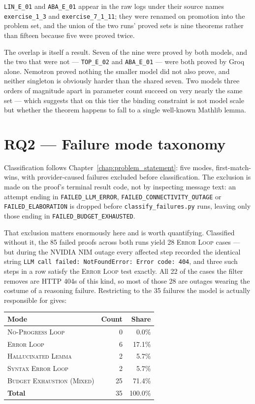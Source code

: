 \texttt{LIN\_E\_01} and \texttt{ABA\_E\_01} appear in the raw logs under their
source names \texttt{exercise\_1\_3} and \texttt{exercise\_7\_1\_11}; they were
renamed on promotion into the problem set, and the union of the two runs' proved
sets is nine theorems rather than fifteen because five were proved twice.

The overlap is itself a result.
Seven of the nine were proved by both models, and the two that were not ---
\texttt{TOP\_E\_02} and \texttt{ABA\_E\_01} --- were both proved by Groq alone.
Nemotron proved nothing the smaller model did not also prove, and neither
singleton is obviously harder than the shared seven.
Two models three orders of magnitude apart in parameter count succeed on very
nearly the same set --- which suggests that on this tier the binding constraint
is not model scale but whether the theorem happens to fall to a single
well-known Mathlib lemma.

\section{RQ2 --- Failure mode taxonomy}
\label{sec:results_rq2}

Classification follows Chapter~\ref{chap:problem_statement}: five modes,
first-match-wins, with provider-caused failures excluded before classification.
The exclusion is made on the proof's terminal result code, not by inspecting
message text: an attempt ending in \texttt{FAILED\_LLM\_ERROR},
\texttt{FAILED\_CONNECTIVITY\_OUTAGE} or \texttt{FAILED\_ELABORATION} is dropped
before \texttt{classify\_failures.py} runs, leaving only those ending in
\texttt{FAILED\_BUDGET\_EXHAUSTED}.

That exclusion matters enormously here and is worth quantifying.
Classified without it, the 85 failed proofs across both runs yield 28
\textsc{Error Loop} cases --- but during the NVIDIA NIM outage every affected
step recorded the identical string \texttt{LLM call failed: NotFoundError: Error
code: 404}, and three such steps in a row satisfy the \textsc{Error Loop} test
exactly. All 22 of the cases the filter removes are HTTP 404s of this kind, so
most of those 28 are outages wearing the costume of a reasoning failure.
Restricting to the 35 failures the model is actually responsible for gives:

\begin{center}
\begin{tabular}{@{}lrr@{}}
\hline
\textbf{Mode} & \textbf{Count} & \textbf{Share} \\
\hline
\textsc{No-Progress Loop}         &  0 &  0.0\% \\
\textsc{Error Loop}               &  6 & 17.1\% \\
\textsc{Hallucinated Lemma}       &  2 &  5.7\% \\
\textsc{Syntax Error Loop}        &  2 &  5.7\% \\
\textsc{Budget Exhaustion (Mixed)}& 25 & 71.4\% \\
\hline
\textbf{Total}                    & 35 & 100.0\% \\
\hline
\end{tabular}
\end{center}

